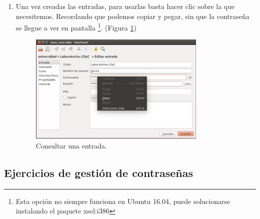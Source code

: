 \documentclass[a4paper,12pt]{article}
\begin{document}
\begin{enumerate}
    \item
Una vez creadas las entradas, para usarlas basta hacer clic sobre la que necesitemos.
Recordando que podemos copiar y pegar, sin que la contraseña se llegue a ver en pantalla
\footnote{Esta opción no siempre funciona en Ubuntu 16.04, puede solucionarse instalando 
el paquete xsel:i386}.
(Figura \ref{fig:kee5})
\begin{figure}[htpb]
  \centering
    \includegraphics[width=0.8\textwidth]{images/kee05}
  \caption{Consultar una entrada.}
  \label{fig:kee5}
\end{figure}

    \end{enumerate}

\subsection{Ejercicios de gestión de contraseñas}
\end{document}

